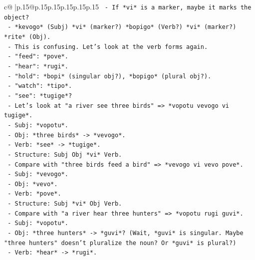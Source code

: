 \documentclass{article}
\begin{document}
{\begin{supertabular}{c@{$\;$}|p{.15\linewidth}@{}p{.15\linewidth}p{.15\linewidth}p{.15\linewidth}p{.15\linewidth}p{.15\linewidth}}
{{{\texttt{                       {-} If *vi* is a marker, maybe it marks the object?} \\
\texttt{                       {-} *kevogo* (Subj) *vi* (marker?) *bopigo* (Verb?) *vi* (marker?) *rite* (Obj).} \\
\texttt{                       {-} This is confusing. Let's look at the verb forms again.} \\
\texttt{                       {-} "feed": *pove*.} \\
\texttt{                       {-} "hear": *rugi*.} \\
\texttt{                       {-} "hold": *bopi* (singular obj?), *bopigo* (plural obj?).} \\
\texttt{                       {-} "watch": *tipo*.} \\
\texttt{                       {-} "see": *tugige*?} \\
\texttt{                       {-} Let's look at "a river see three birds" => *vopotu vevogo vi tugige*.} \\
\texttt{                         {-} Subj: *vopotu*.} \\
\texttt{                         {-} Obj: *three birds* {-}> *vevogo*.} \\
\texttt{                         {-} Verb: *see* {-}> *tugige*.} \\
\texttt{                         {-} Structure: Subj Obj *vi* Verb.} \\
\texttt{                       {-} Compare with "three birds feed a bird" => *vevogo vi vevo pove*.} \\
\texttt{                         {-} Subj: *vevogo*.} \\
\texttt{                         {-} Obj: *vevo*.} \\
\texttt{                         {-} Verb: *pove*.} \\
\texttt{                         {-} Structure: Subj *vi* Obj Verb.} \\
\texttt{                       {-} Compare with "a river hear three hunters" => *vopotu rugi guvi*.} \\
\texttt{                         {-} Subj: *vopotu*.} \\
\texttt{                         {-} Obj: *three hunters* {-}> *guvi*? (Wait, *guvi* is singular. Maybe "three hunters" doesn't pluralize the noun? Or *guvi* is plural?)} \\
\texttt{                         {-} Verb: *hear* {-}> *rugi*.} \\
}}}
\end{supertabular}}
\end{document}
